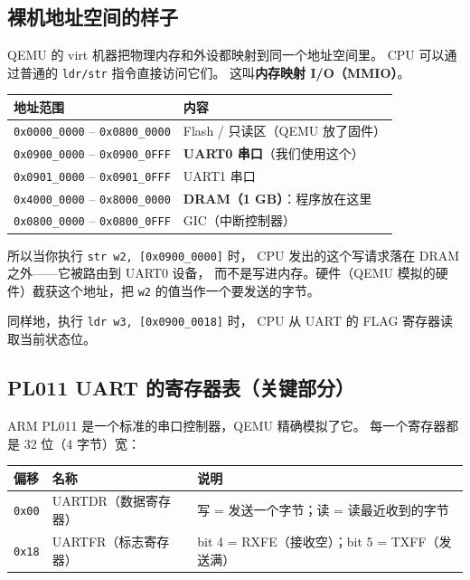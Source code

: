\subsection{裸机地址空间的样子}

QEMU 的 virt 机器把物理内存和外设都映射到同一个地址空间里。
CPU 可以通过普通的 \texttt{ldr/str} 指令直接访问它们。
这叫\textbf{内存映射 I/O（MMIO）}。

\begin{center}
\begin{tabular}{l l}
\hline
地址范围 & 内容 \\
\hline
\texttt{0x0000\_0000} -- \texttt{0x0800\_0000} & Flash / 只读区（QEMU 放了固件）\\
\texttt{0x0900\_0000} -- \texttt{0x0900\_0FFF} & \textbf{UART0 串口}（我们使用这个）\\
\texttt{0x0901\_0000} -- \texttt{0x0901\_0FFF} & UART1 串口 \\
\texttt{0x4000\_0000} -- \texttt{0x8000\_0000} & \textbf{DRAM（1 GB）}：程序放在这里 \\
\texttt{0x0800\_0000} -- \texttt{0x0800\_0FFF} & GIC（中断控制器）\\
\hline
\end{tabular}
\end{center}

所以当你执行 \texttt{str w2, [0x0900\_0000]} 时，
CPU 发出的这个写请求落在 DRAM 之外——它被路由到 UART0 设备，
而不是写进内存。硬件（QEMU 模拟的硬件）截获这个地址，把 \texttt{w2}
的值当作一个要发送的字节。

同样地，执行 \texttt{ldr w3, [0x0900\_0018]} 时，
CPU 从 UART 的 FLAG 寄存器读取当前状态位。

\subsection{PL011 UART 的寄存器表（关键部分）}

ARM PL011 是一个标准的串口控制器，QEMU 精确模拟了它。
每一个寄存器都是 32 位（4 字节）宽：

\begin{center}
\begin{tabular}{l l l}
\hline
偏移 & 名称 & 说明 \\
\hline
\texttt{0x00} & UARTDR（数据寄存器） & 写 = 发送一个字节；读 = 读最近收到的字节 \\
\texttt{0x18} & UARTFR（标志寄存器） & bit 4 = RXFE（接收空）；bit 5 = TXFF（发送满）\\
\hline
\end{tabular}
\end{center}

